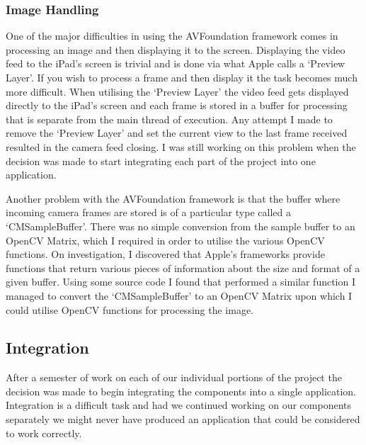 \documentclass{article}
\begin{document}
\subsubsection{Image Handling}

One of the major difficulties in using the AVFoundation framework comes in processing an image and then displaying it to the screen. Displaying the video feed to the iPad's screen is trivial and is done via what Apple calls a `Preview Layer'. If you wish to process a frame and then display it the task becomes much more difficult. When utilising the `Preview Layer' the video feed gets displayed directly to the iPad's screen and each frame is stored in a buffer for processing that is separate from the main thread of execution. %
 Any attempt I made to remove the `Preview Layer' and set the current view to the last frame received resulted in the camera feed closing. 
 I was still working on this problem when the decision was made to start integrating each part of the project into one application.

Another problem with the AVFoundation framework is that the buffer where incoming camera frames are stored is of a particular type called a `CMSampleBuffer'. There was no simple conversion from the sample buffer to an OpenCV Matrix, which I required in order to utilise the various OpenCV functions. On investigation, I discovered that Apple's frameworks provide functions that return various pieces of information about the size and format of a given buffer. Using some source code I found that performed a similar function \cite{iOS} %
I managed to convert the `CMSampleBuffer' to an OpenCV Matrix upon which I could utilise OpenCV functions for processing the image.


\subsection{Integration}

After a semester of work on each of our individual portions of the project the decision was made to begin integrating the components into a single application. Integration is a difficult task and had we continued working on our components separately we might never have produced an application that could be considered to work correctly.
\end{document}
